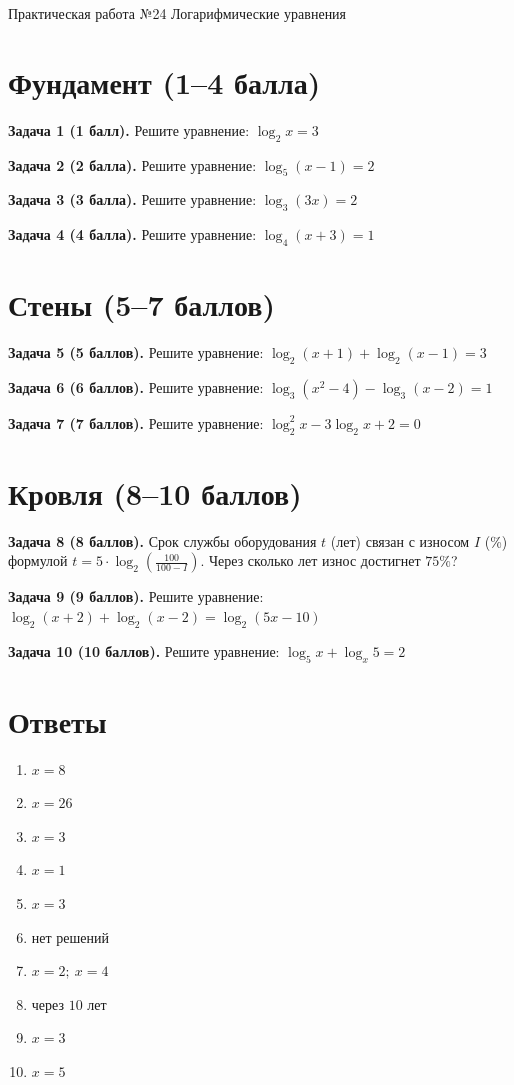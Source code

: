 \documentclass{umk-matematika}
\begin{document}
\maketitlepage
    {Практическая работа №24}
    {Логарифмические уравнения}
    {}

\section{Фундамент (1--4 балла)}

\textbf{Задача 1 (1 балл).} Решите уравнение: $\log_{2} x = 3$

\textbf{Задача 2 (2 балла).} Решите уравнение: $\log_{5} (x - 1) = 2$

\textbf{Задача 3 (3 балла).} Решите уравнение: $\log_{3} (3x) = 2$

\textbf{Задача 4 (4 балла).} Решите уравнение: $\log_{4} (x + 3) = 1$

\section{Стены (5--7 баллов)}

\textbf{Задача 5 (5 баллов).} Решите уравнение: $\log_{2} (x + 1) + \log_{2} (x - 1) = 3$

\textbf{Задача 6 (6 баллов).} Решите уравнение: $\log_{3} (x^2 - 4) - \log_{3} (x - 2) = 1$

\textbf{Задача 7 (7 баллов).} Решите уравнение: $\log_{2}^{2} x - 3\log_{2} x + 2 = 0$

\section{Кровля (8--10 баллов)}

\textbf{Задача 8 (8 баллов).} Срок службы оборудования $t$ (лет) связан с износом $I$ (\%) формулой $t = 5 \cdot \log_{2} \left(\frac{100}{100 - I}\right)$. Через сколько лет износ достигнет $75\%$?

\textbf{Задача 9 (9 баллов).} Решите уравнение: $\log_{2} (x + 2) + \log_{2} (x - 2) = \log_{2} (5x - 10)$

\textbf{Задача 10 (10 баллов).} Решите уравнение: $\log_{5} x + \log_{x} 5 = 2$

\newpage
\section*{Ответы}

\begin{enumerate}
  \item $x = 8$
  \item $x = 26$
  \item $x = 3$
  \item $x = 1$
  \item $x = 3$
  \item нет решений
  \item $x = 2;\ x = 4$
  \item через $10$ лет
  \item $x = 3$
  \item $x = 5$
\end{enumerate}
\end{document}
